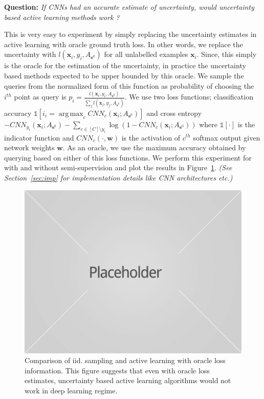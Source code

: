 \documentclass{article}
\DeclareMathOperator*{\argmax}{arg\,max}
\begin{document}
\noindent\textbf{Question:} \emph{If CNNs had an accurate estimate of uncertainty, would uncertainty based active learning methods work ?}

This is very easy to experiment by simply replacing the uncertainty estimates in active learning with oracle ground truth loss. In other words, we replace the uncertainty with $l(\mathbf{x}_i,y_i,A_{\mathbf{s}^0})$ for all unlabelled examples $\mathbf{x}_i$. Since, this simply is the oracle for the estimation of the uncertainty, in practice the uncertainty based methods expected to be upper bounded by this oracle. We sample the queries from the normalized form of this function as probability of choosing the $i^{th}$ point as query is $p_i=\frac{l(\mathbf{x}_i,y_i,A_{\mathbf{s}^0})}{\sum_j l(\mathbf{x}_j,y_j,A_{\mathbf{s}^0})}$. We use two loss functions; classification accuracy \mbox{$\mathds{1}[i_i = \argmax_c CNN_c(\mathbf{x}_i;A_{\mathbf{s}^0})]$} and cross entropy
\mbox{$ - CNN_{y_i}(\mathbf{x}_i;A_{\mathbf{s}^0}) -\sum_{c \in [C] \setminus y_i} \log(1-  CNN_{c}(\mathbf{x}_i;A_{\mathbf{s}^0}))$} where $\mathds{1}[\cdot]$ is the indicator function and $CNN_c(\cdot,\mathbf{w})$ is the activation of $c^{th}$ softmax output given network weights $\mathbf{w}$. As an oracle, we use the maximum accuracy obtained by querying based on either of this loss functions. We perform this experiment for with and without semi-supervision and plot the results in Figure~\ref{fig:neg}. \emph{(See Section~\ref{sec:imp} for implementation details like CNN architectures etc.)}

\begin{figure}[ht]
\includegraphics[width=\columnwidth]{placeholder1.jpg}
\caption{Comparison of iid. sampling and active learning with oracle loss information. This figure suggests that even with oracle loss estimates, uncertainty based active learning algorithms would not work in deep learning regime.}
\label{fig:neg}
\end{figure}
\end{document}
